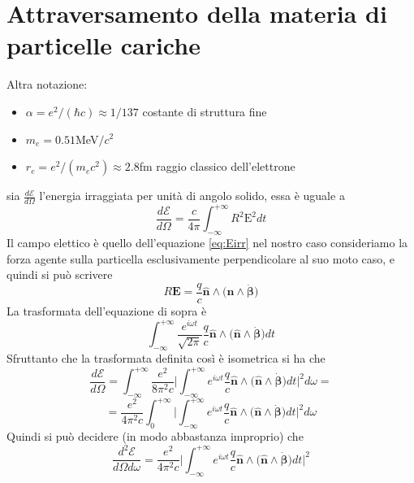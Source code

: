 \documentclass[11pt,a4paper]{report}
\newcommand{\vettore}[1]{\mathbf{#1}}
\newcommand{\vettorec}[1]{\textrm{#1}}
\newcommand{\pvet}[2]{#1\wedge #2}
\begin{document}
	\section{Attraversamento della materia di particelle cariche}
		Altra notazione:
		\begin{itemize}
			\item $\alpha=e^2/(\hbar c)\approx 1/137$ costante di struttura fine
			\item $m_e=0.51$MeV$/c^2$
			\item $r_e=e^2/(m_ec^2)\approx 2.8$fm raggio classico dell'elettrone
		\end{itemize}
		sia $\frac{d\mathcal{E}}{d\Omega}$ l'energia irraggiata per unità di angolo solido, essa è uguale a
		\begin{equation}
			\frac{d\mathcal{E}}{d\Omega}=\frac{c}{4\pi}\int_{-\infty} ^{+\infty} R^2\vettorec E^2 dt
		\end{equation}
		Il campo elettico è quello dell'equazione \ref{eq:Eirr} nel nostro caso consideriamo la forza agente sulla particella esclusivamente perpendicolare al suo moto caso, e quindi si può scrivere
		\begin{equation}
			R\vettore E=\frac{q}{c}\pvet{\hat{\vettore n}}{\big(\pvet{\hat{\vettore n}}{\dot{\vettore \beta}}\big)}
		\end{equation}
		La trasformata dell'equazione di sopra è 
		\begin{equation}
			\int_{-\infty} ^{+\infty} \frac{e^{i\omega t}}{\sqrt{2\pi}}\frac{q}{c}\pvet{\hat{\vettore n}}{\big(\pvet{\hat{\vettore n}}{\dot{\vettore \beta}}\big)} dt
		\end{equation}
		Sfruttanto che la trasformata definita così è isometrica si ha che
		\begin{equation}
			\frac{d\mathcal{E}}{d\Omega}=\int_{-\infty} ^{+\infty} 
			\frac{e^2}{8\pi^2 c}\Bigg|\int_{-\infty} ^{+\infty}e^{i\omega t}\frac{q}{c}\pvet{\hat{\vettore n}}{\big(\pvet{\hat{\vettore n}}{\dot{\vettore \beta}}\big)} dt\Bigg|^2
			d\omega=
		\end{equation}
		\[
			=\frac{e^2}{4\pi^2 c}\int_0 ^{+\infty} 
			\Bigg|\int_{-\infty} ^{+\infty}e^{i\omega t}\frac{q}{c}\pvet{\hat{\vettore n}}{\big(\pvet{\hat{\vettore n}}{\dot{\vettore \beta}}\big)} dt\Bigg|^2
			d\omega	
		\]
		Quindi si può decidere (in modo abbastanza improprio) che 
		\begin{equation}
			\frac{d^2\mathcal{E}}{d\Omega d\omega}=\frac{e^2}{4\pi^2 c}\Bigg|\int_{-\infty} ^{+\infty}e^{i\omega t}\frac{q}{c}\pvet{\hat{\vettore n}}{\big(\pvet{\hat{\vettore n}}{\dot{\vettore \beta}}\big)} dt\Bigg|^2
		\end{equation}
\end{document}
